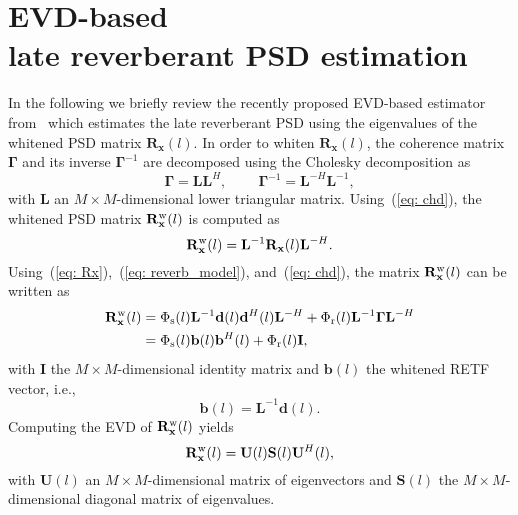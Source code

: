 \documentclass{article}
\begin{document}
\section{EVD-based \\ late reverberant PSD estimation}
\label{sec: evd_psd}
In the following we briefly review the recently proposed EVD-based estimator from~\cite{Kodrasi_ICASSP_2017} which estimates the late reverberant PSD using the eigenvalues of the whitened PSD matrix $\mathbf{R}_{\mathbf{x}}(l)$.
In order to whiten $\mathbf{R}_{\mathbf{x}}(l)$, the coherence matrix $\boldsymbol{\Gamma}$ and its inverse $\boldsymbol{\Gamma}^{-1}$ are decomposed using the Cholesky decomposition as
\begin{equation}
\label{eq: chd}
\boldsymbol{\Gamma} = \mathbf{L}\mathbf{L}^H, \; \; \; \; \; \; \; \; \boldsymbol{\Gamma}^{-1} = \mathbf{L}^{-H} \mathbf{L}^{-1},
\end{equation}
with $\mathbf{L}$ an $M \times M$-dimensional lower triangular matrix.
Using~(\ref{eq: chd}), the whitened PSD matrix $\mathbf{R}^{\rm w}_{\mathbf{x}}(l)$ is computed as
\begin{equation}
  \label{eq: Rxw}
  \mathbf{R}^{\rm w}_{\mathbf{x}}(l) =   \mathbf{L}^{-1} \mathbf{R}_{\mathbf{x}}(l) \mathbf{L}^{-H}.
\end{equation}
Using~(\ref{eq: Rx}),~(\ref{eq: reverb_model}), and~(\ref{eq: chd}), the matrix $\mathbf{R}^{\rm w}_{\mathbf{x}}(l)$ can be written as
\begin{align}
     \mathbf{R}^{\rm w}_{\mathbf{x}}(l) & = \Phi_{\rm s}(l) \mathbf{L}^{-1}\mathbf{d}(l) \mathbf{d}^H(l)\mathbf{L}^{-H} + \Phi_{\rm r}(l) \mathbf{L}^{-1} \boldsymbol{\Gamma} \mathbf{L}^{-H} \\
  \label{eq: prewhiten}
& = \Phi_{\rm s}(l) \mathbf{b}(l) \mathbf{b}^H(l) + \Phi_{\rm r}(l) \mathbf{I},
\end{align}
with $\mathbf{I}$ the $M \times M$-dimensional identity matrix and $\mathbf{b}(l)$ the whitened RETF vector, i.e.,
\begin{equation}
  \label{eq: preretf}
  \mathbf{b}(l) = \mathbf{L}^{-1}\mathbf{d}(l).
\end{equation}
Computing the EVD of $\mathbf{R}^{\rm w}_{\mathbf{x}}(l)$ yields
\begin{equation}
  \label{eq: evd}
\mathbf{R}^{\rm w}_{\mathbf{x}}(l) = \mathbf{U}(l) \mathbf{S}(l)\mathbf{U}^H(l),
\end{equation}
with $\mathbf{U}(l)$ an $M \times M$-dimensional matrix of eigenvectors and $\mathbf{S}(l)$ the $M \times M$-dimensional diagonal matrix of eigenvalues.
\end{document}
